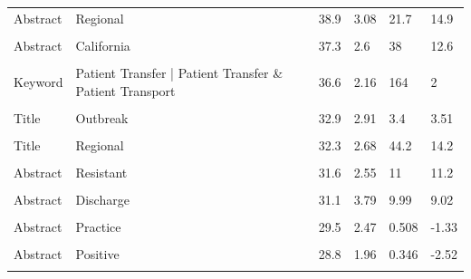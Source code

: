 \documentclass[
]{article}
\begin{document}
\begin{table}[!h]
{\begin{tabular}[t]{llllll}
\addlinespace
Abstract & Regional & 38.9 & 3.08 & 21.7 & 14.9\\
\cellcolor{gray!6}{Abstract} & \cellcolor{gray!6}{Agent} & \cellcolor{gray!6}{38.1} & \cellcolor{gray!6}{2.74} & \cellcolor{gray!6}{4.36} & \cellcolor{gray!6}{6.28}\\
Abstract & California & 37.3 & 2.6 & 38 & 12.6\\
\cellcolor{gray!6}{Title} & \cellcolor{gray!6}{Transfer} & \cellcolor{gray!6}{36.6} & \cellcolor{gray!6}{3.54} & \cellcolor{gray!6}{27} & \cellcolor{gray!6}{11.8}\\
Keyword & Patient Transfer | Patient Transfer \& Patient Transport & 36.6 & 2.16 & 164 & 2\\
\addlinespace
\cellcolor{gray!6}{Abstract} & \cellcolor{gray!6}{Finding} & \cellcolor{gray!6}{33.2} & \cellcolor{gray!6}{1.78} & \cellcolor{gray!6}{0.372} & \cellcolor{gray!6}{-2.35}\\
Title & Outbreak & 32.9 & 2.91 & 3.4 & 3.51\\
\cellcolor{gray!6}{Abstract} & \cellcolor{gray!6}{Collect} & \cellcolor{gray!6}{32.4} & \cellcolor{gray!6}{1.82} & \cellcolor{gray!6}{0.408} & \cellcolor{gray!6}{-1.95}\\
Title & Regional & 32.3 & 2.68 & 44.2 & 14.2\\
\cellcolor{gray!6}{Abstract} & \cellcolor{gray!6}{Network} & \cellcolor{gray!6}{31.6} & \cellcolor{gray!6}{3.09} & \cellcolor{gray!6}{12.8} & \cellcolor{gray!6}{11.7}\\
\addlinespace
Abstract & Resistant & 31.6 & 2.55 & 11 & 11.2\\
\cellcolor{gray!6}{Abstract} & \cellcolor{gray!6}{Outcome} & \cellcolor{gray!6}{31.2} & \cellcolor{gray!6}{1.93} & \cellcolor{gray!6}{0.178} & \cellcolor{gray!6}{-2.95}\\
Abstract & Discharge & 31.1 & 3.79 & 9.99 & 9.02\\
\cellcolor{gray!6}{Abstract} & \cellcolor{gray!6}{2014} & \cellcolor{gray!6}{30.3} & \cellcolor{gray!6}{1.84} & \cellcolor{gray!6}{0.588} & \cellcolor{gray!6}{-1.04}\\
Abstract & Practice & 29.5 & 2.47 & 0.508 & -1.33\\
\addlinespace
\cellcolor{gray!6}{Abstract} & \cellcolor{gray!6}{Culture} & \cellcolor{gray!6}{28.9} & \cellcolor{gray!6}{2.14} & \cellcolor{gray!6}{0.378} & \cellcolor{gray!6}{-1.66}\\
Abstract & Positive & 28.8 & 1.96 & 0.346 & -2.52\\
\cellcolor{gray!6}{Abstract} & \cellcolor{gray!6}{Gene} & \cellcolor{gray!6}{28.3} & \cellcolor{gray!6}{1.29} & \cellcolor{gray!6}{0.00000024} & \cellcolor{gray!6}{-0.0415}\\

\end{tabular}}
\end{table}
\end{document}
